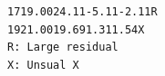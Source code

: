 \documentclass[12pt,a4paper]{article}
\newcommand{\code}[1]{\texttt{#1}}
\begin{document}
\hspace*{0.25cm}\code{17}\hspace*{1cm}\code{19.00}\hspace*{1cm}\code{24.11}\hspace*{1.5cm}\code{-5.11}\hspace*{2.5cm}\code{-2.11}\hspace{1cm}\code{R}\\
\hspace*{0.25cm}\code{19}\hspace*{1cm}\code{21.00}\hspace*{1cm}\code{19.69}\hspace*{1.75cm}\code{1.31}\hspace*{2.75cm}\code{1.54}\hspace{1cm}\code{X}\\
\code{R: Large residual}\\
\code{X: Unsual X}
\end{document}
